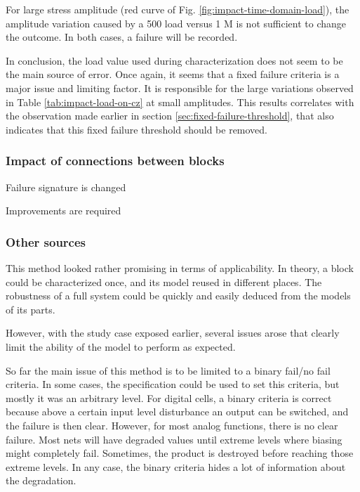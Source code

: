 For large stress amplitude (red curve of Fig. \ref{fig:impact-time-domain-load}), the amplitude variation caused by a 500 \textOmega{} load versus 1 M\textOmega{} is not sufficient to change the outcome.
In both cases, a failure will be recorded.

In conclusion, the load value used during characterization does not seem to be the main source of error.
Once again, it seems that a fixed failure criteria is a major issue and limiting factor.
It is responsible for the large variations observed in Table \ref{tab:impact-load-on-cz} at small amplitudes.
This results correlates with the observation made earlier in section \ref{sec:fixed-failure-threshold}, that also indicates that this fixed failure threshold should be removed.


\subsubsection{Impact of connections between blocks}
\label{sec:impact-missing-conns}

Failure signature is changed

Improvements are required

\subsubsection{Other sources}


This method looked rather promising in terms of applicability.
In theory, a block could be characterized once, and its model reused in different places.
The robustness of a full system could be quickly and easily deduced from the models of its parts.

However, with the study case exposed earlier, several issues arose that clearly limit the ability of the model to perform as expected.

So far the main issue of this method is to be limited to a binary fail/no fail criteria.
In some cases, the specification could be used to set this criteria, but mostly it was an arbitrary level.
For digital cells, a binary criteria is correct because above a certain input level disturbance an output can be switched, and the failure is then clear.
However, for most analog functions, there is no clear failure.
Most nets will have degraded values until extreme levels where biasing might completely fail.
Sometimes, the product is destroyed before reaching those extreme levels.
In any case, the binary criteria hides a lot of information about the degradation.

